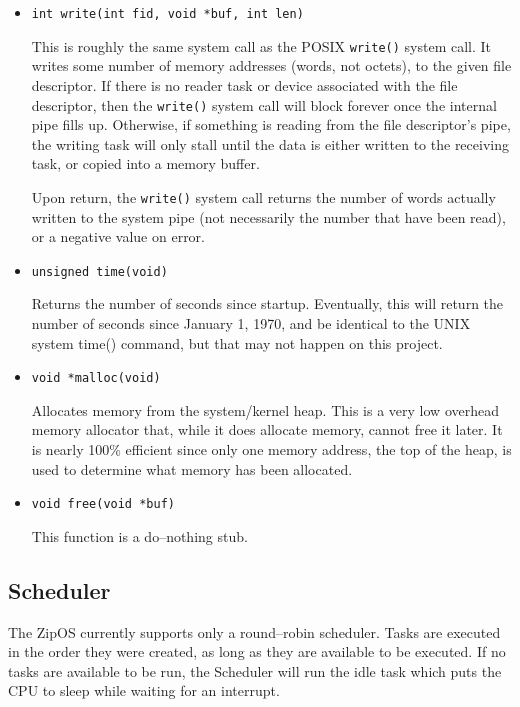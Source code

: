 \documentclass{gqtekspec}
\begin{document}
\begin{itemize}
\item {\tt int write(int fid, void *buf, int len)}

	This is roughly the same system call as the POSIX {\tt write()} system
	call.  It writes some number of memory addresses (words, not octets),
	to the given file descriptor.  If there is no reader task or device
	associated with the file descriptor, then the {\tt write()} system
	call will block forever once the internal pipe fills up.  Otherwise,
	if something is reading from the file descriptor's pipe, the writing
	task will only stall until the data is either written to the receiving
	task, or copied into a memory buffer.

	Upon return, the {\tt write()} system call returns the number of words
	actually written to the system pipe (not necessarily the number that
	have been read), or a negative value on error.

\item {\tt unsigned time(void) }

	Returns the number of seconds since startup.  Eventually, this will
	return the number of seconds since January 1, 1970, and be identical
	to the UNIX system time() command, but that may not happen on this
	project.


\item {\tt void *malloc(void)}

	Allocates memory from the system/kernel heap.  This is a very low
	overhead memory allocator that, while it does allocate memory, cannot
	free it later.  It is nearly 100\% efficient since only one memory
	address, the top of the heap, is used to determine what memory has
	been allocated.

\item {\tt void free(void *buf)}

	This function is a do--nothing stub.

\end{itemize}
\subsection{Scheduler}
The ZipOS currently supports only a round--robin scheduler.  Tasks are executed
in the order they were created, as long as they are available to be executed.
If no tasks are available to be run, the Scheduler will run the idle task which
puts the CPU to sleep while waiting for an interrupt.
\end{document}
